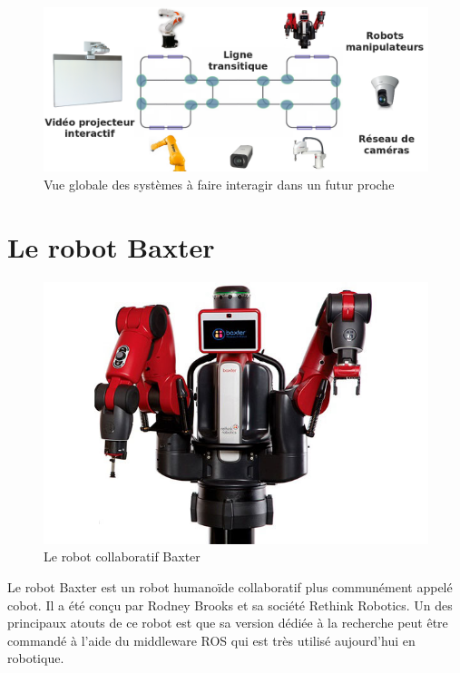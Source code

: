 \documentclass[a4paper,french, titlepage]{book}
\begin{document}
\vspace{1cm}

\begin{figure}[H] 
\begin{center}
\includegraphics[scale=0.35]{Images/projet_global.png} 
\end{center}
\caption{Vue globale des systèmes à faire interagir dans un futur proche}
\label{projet_global}
\end{figure} 

\vspace{1cm}

\newpage
\section{Le robot Baxter \label{section_lerobotbaxter}}

\begin{figure}
\includegraphics[scale=0.3]{Images/baxter_hum.jpg}
\caption{Le robot collaboratif Baxter}
\label{baxter_hum}
\end{figure}

Le robot Baxter est un robot humanoïde collaboratif plus communément appelé cobot. Il a été conçu par Rodney Brooks et sa société Rethink Robotics. Un des principaux atouts de ce robot est que sa version dédiée à la recherche peut être commandé à l'aide du middleware ROS qui est très utilisé aujourd'hui en robotique.\\
\end{document}
